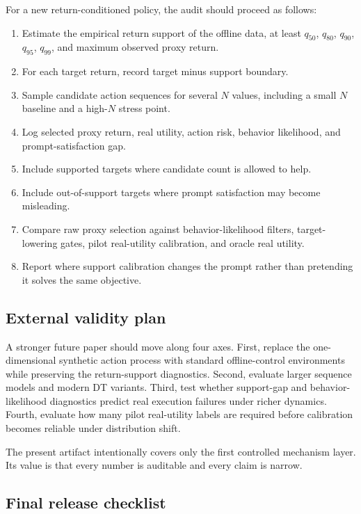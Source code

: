 For a new return-conditioned policy, the audit should proceed as follows:
\begin{enumerate}
  \item Estimate the empirical return support of the offline data, at least $q_{50}$, $q_{80}$, $q_{90}$, $q_{95}$, $q_{99}$, and maximum observed proxy return.
  \item For each target return, record target minus support boundary.
  \item Sample candidate action sequences for several $N$ values, including a small $N$ baseline and a high-$N$ stress point.
  \item Log selected proxy return, real utility, action risk, behavior likelihood, and prompt-satisfaction gap.
  \item Include supported targets where candidate count is allowed to help.
  \item Include out-of-support targets where prompt satisfaction may become misleading.
  \item Compare raw proxy selection against behavior-likelihood filters, target-lowering gates, pilot real-utility calibration, and oracle real utility.
  \item Report where support calibration changes the prompt rather than pretending it solves the same objective.
\end{enumerate}

\subsection{External validity plan}

A stronger future paper should move along four axes. First, replace the one-dimensional synthetic action process with standard offline-control environments while preserving the return-support diagnostics. Second, evaluate larger sequence models and modern DT variants. Third, test whether support-gap and behavior-likelihood diagnostics predict real execution failures under richer dynamics. Fourth, evaluate how many pilot real-utility labels are required before calibration becomes reliable under distribution shift.

The present artifact intentionally covers only the first controlled mechanism layer. Its value is that every number is auditable and every claim is narrow.

\subsection{Final release checklist}


